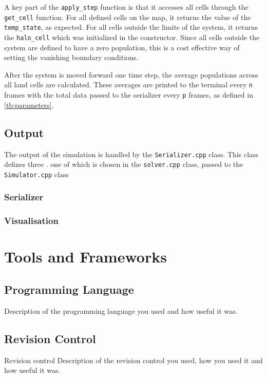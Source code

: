 \documentclass[a4paper,11pt]{article}
\begin{document}
A key part of the \texttt{apply\_step} function is that it accesses all cells through the \texttt{get\_cell} function.  For all defined cells on the map, it returns the value of the \texttt{temp\_state}, as expected.  For all cells outside the limits of the system, it returns the \texttt{halo\_cell} which was initialized in the constructor.  Since all cells outside the system are defined to have a zero population, this is a cost effective way of setting the vanishing boundary conditions.

After the system is moved forward one time step, the average populations across all land cells are calculated.  These averages are printed to the terminal every \texttt{n} frames with the total data passed to the serializer every \texttt{p} frames, as defined in \ref{tb:parameters}.

\subsection{Output}\label{output}

The output of the simulation is handled by the \texttt{Serializer.cpp} class.  This class defines three . one of which is chosen in the \texttt{solver.cpp} class, passed to the \texttt{Simulator.cpp} class

\subsubsection{Serializer}

\subsubsection{Visualisation}

\section{Tools and Frameworks}

\subsection{Programming Language}
Description of the programming language you used and how useful it was.

\subsection{Revision Control}
Revision control Description of the revision control you used, how you used it and how useful it was.
\end{document}
